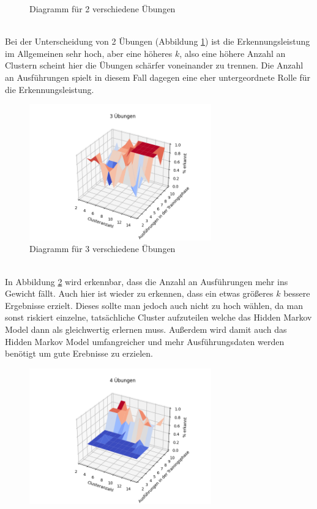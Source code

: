 \documentclass{article}
\begin{document}
\begin{align-*}
\begin{figure}[h]
\caption{Diagramm für 2 verschiedene Übungen}
\label{fig:zwei}
\end{figure}\\
Bei der Unterscheidung von 2 Übungen (Abbildung \ref{fig:zwei}) ist die Erkennungsleistung im Allgemeinen sehr hoch, aber eine höheres $k$, also eine höhere Anzahl an Clustern scheint hier die Übungen schärfer voneinander zu trennen.
Die Anzahl an Ausführungen spielt in diesem Fall dagegen eine eher untergeordnete Rolle für die Erkennungsleistung.
\medskip
\begin{figure}[h]
\centering
\includegraphics[width=0.7\textwidth]{figures/3_graph.png}
\caption{Diagramm für 3 verschiedene Übungen}
\label{fig:drei}
\end{figure}\\
In Abbildung \ref{fig:drei} wird erkennbar, dass die Anzahl an Ausführungen mehr ins Gewicht fällt.
Auch hier ist wieder zu erkennen, dass ein etwas größeres $k$ bessere Ergebnisse erzielt.
Dieses sollte man jedoch auch nicht zu hoch wählen, da man sonst riskiert einzelne, tatsächliche Cluster aufzuteilen welche das Hidden Markov Model dann als gleichwertig erlernen muss.
Außerdem wird damit auch das Hidden Markov Model umfangreicher und mehr Ausführungsdaten werden benötigt um gute Erebnisse zu erzielen.\\
\medskip
\begin{figure}[htbp]
\centering
\includegraphics[width=0.7\textwidth]{figures/4_graph.png}

\end{figure}
\end{align-*}
\end{document}
